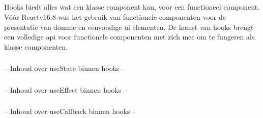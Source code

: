 
\subsection{}
\label{sec:hooks}

Hooks biedt alles wat een klasse component kan, voor een functioneel component. Vóór Reactv16.8 was het gebruik van functionele componenten voor de presentatie van domme en eenvoudige \gls{ui} elementen. De komst van hooks brengt een volledige \gls{api} voor functionele componenten met zich mee om te fungeren als klasse componenten.\\

\subsubsection{}
\label{sec:useState}

-- Inhoud over useState binnen hooks --

\subsubsection{}
\label{sec:useEffect}

-- Inhoud over useEffect binnen hooks --

\subsubsection{}
\label{sec:useCallback}

-- Inhoud over useCallback binnen hooks --


\section{}

\subsection{}
\label{sec:bundeling}

